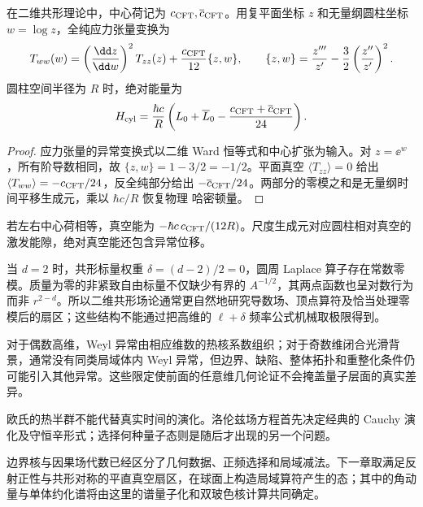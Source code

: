 \begin{proposition}[二维圆柱的异常真空能]
在二维共形理论中，中心荷记为 $c_{\rm CFT},\overline c_{\rm CFT}$。用复平面坐标 $z$ 和无量纲圆柱坐标 $w=\log z$，全纯应力张量变换为
\begin{equation}\label{eq:ghs-stress-schwarzian}
 T_{ww}(w)=\left(\frac{\dd z}{\dd w}\right)^2T_{zz}(z)
 +\frac{c_{\rm CFT}}{12}\{z,w\},\qquad
 \{z,w\}=\frac{z'''}{z'}-\frac32\left(\frac{z''}{z'}\right)^2.
\end{equation}
圆柱空间半径为 $R$ 时，绝对能量为
\begin{equation}\label{eq:ghs-virasoro-cylinder-hamiltonian}
 H_{\rm cyl}=\frac{\hbar c}{R}\left(L_0+\overline L_0-
 \frac{c_{\rm CFT}+\overline c_{\rm CFT}}{24}\right).
\end{equation}
\end{proposition}
\begin{proof}
应力张量的异常变换式以二维 Ward 恒等式和中心扩张为输入。对 $z=\ee^w$，所有阶导数相同，故 $\{z,w\}=1-3/2=-1/2$。平面真空 $\langle T_{zz}\rangle=0$ 给出 $\langle T_{ww}\rangle=-c_{\rm CFT}/24$，反全纯部分给出 $-\overline c_{\rm CFT}/24$。两部分的零模之和是无量纲时间平移生成元，乘以 $\hbar c/R$ 恢复物理 哈密顿量。
\end{proof}
若左右中心荷相等，真空能为 $-\hbar c\,c_{\rm CFT}/(12R)$。尺度生成元对应圆柱相对真空的激发能隙，绝对真空能还包含异常位移。

当 $d=2$ 时，共形标量权重 $\delta=(d-2)/2=0$，圆周 Laplace 算子存在常数零模。质量为零的非紧致自由标量不仅缺少有界的 $A^{-1/2}$，其两点函数也呈对数行为而非 $r^{2-d}$。所以二维共形场论通常更自然地研究导数场、顶点算符及恰当处理零模后的扇区；这些结构不能通过把高维的 $\ell+\delta$ 频率公式机械取极限得到。

对于偶数高维，Weyl 异常由相应维数的热核系数组织；对于奇数维闭合光滑背景，通常没有同类局域体内 Weyl 异常，但边界、缺陷、整体拓扑和重整化条件仍可能引入其他异常。这些限定使前面的任意维几何论证不会掩盖量子层面的真实差异。

欧氏的热半群不能代替真实时间的演化。洛伦兹场方程首先决定经典的 Cauchy 演化及守恒辛形式；选择何种量子态则是随后才出现的另一个问题。



边界核与因果场代数已经区分了几何数据、正频选择和局域减法。下一章取满足反射正性与共形对称的平直真空扇区，在球面上构造局域算符产生的态；其中的角动量与单体约化谱将由这里的谱量子化和双玻色核计算共同确定。
